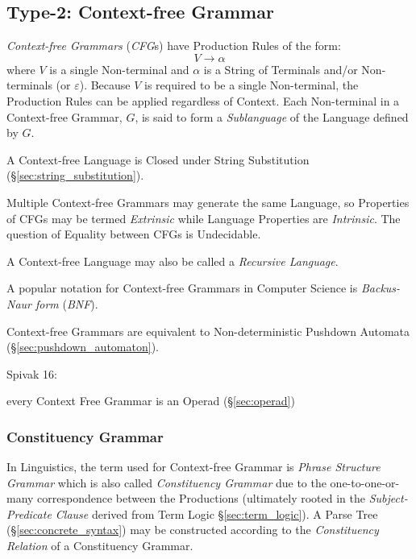 \subsection{Type-2: Context-free Grammar}\label{sec:context_free}

\emph{Context-free Grammars} (\emph{CFG}s) have Production Rules of the form:
\[
  V \rightarrow \alpha
\]
where $V$ is a single Non-terminal and $\alpha$ is a String of Terminals and/or
Non-terminals (or $\varepsilon$). Because $V$ is required to be a single
Non-terminal, the Production Rules can be applied regardless of Context. Each
Non-terminal in a Context-free Grammar, $G$, is said to form a
\emph{Sublanguage} of the Language defined by $G$.

A Context-free Language is Closed under String Substitution
(\S\ref{sec:string_substitution}).

Multiple Context-free Grammars may generate the same Language, so Properties of
CFGs may be termed \emph{Extrinsic} while Language Properties are
\emph{Intrinsic}. The question of Equality between CFGs is Undecidable.

A Context-free Language may also be called a \emph{Recursive Language}.

A popular notation for Context-free Grammars in Computer Science is
\emph{Backus-Naur form} (\emph{BNF}).

Context-free Grammars are equivalent to Non-deterministic Pushdown Automata
(\S\ref{sec:pushdown_automaton}).

Spivak 16:

every Context Free Grammar is an Operad (\S\ref{sec:operad})



\subsubsection{Constituency Grammar}\label{sec:constituency_grammar}

In Linguistics, the term used for Context-free Grammar is \emph{Phrase Structure
  Grammar} which is also called \emph{Constituency Grammar} due to the
one-to-one-or-many correspondence between the Productions (ultimately rooted in
the \emph{Subject-Predicate Clause} derived from Term Logic
\S\ref{sec:term_logic}). A Parse Tree (\S\ref{sec:concrete_syntax}) may be
constructed according to the \emph{Constituency Relation} of a Constituency
Grammar.



